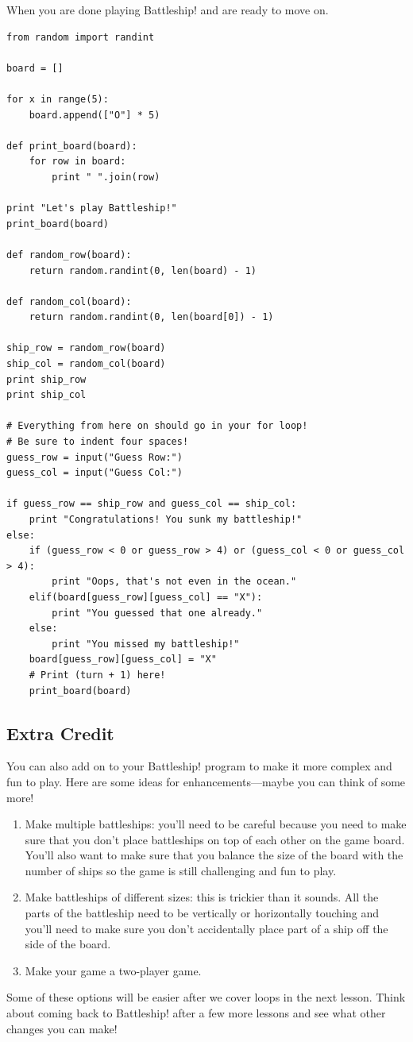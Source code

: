 \documentclass[12pt,a4paper,final,twoside,onecolumn,titlepage]{book}
\begin{document}
When you are done playing Battleship! and are ready to move on.
\begin{lstlisting}
from random import randint

board = []

for x in range(5):
    board.append(["O"] * 5)

def print_board(board):
    for row in board:
        print " ".join(row)

print "Let's play Battleship!"
print_board(board)

def random_row(board):
    return random.randint(0, len(board) - 1)

def random_col(board):
    return random.randint(0, len(board[0]) - 1)

ship_row = random_row(board)
ship_col = random_col(board)
print ship_row
print ship_col

# Everything from here on should go in your for loop!
# Be sure to indent four spaces!
guess_row = input("Guess Row:")
guess_col = input("Guess Col:")

if guess_row == ship_row and guess_col == ship_col:
    print "Congratulations! You sunk my battleship!"
else:
    if (guess_row < 0 or guess_row > 4) or (guess_col < 0 or guess_col > 4):
        print "Oops, that's not even in the ocean."
    elif(board[guess_row][guess_col] == "X"):
        print "You guessed that one already."
    else:
        print "You missed my battleship!"
    board[guess_row][guess_col] = "X"
    # Print (turn + 1) here!
    print_board(board)
\end{lstlisting}

\subsection{Extra Credit}

You can also add on to your Battleship! program to make it more complex and fun to play. Here are some ideas for enhancements—maybe you can think of some more!
\begin{enumerate}
\item    Make multiple battleships: you'll need to be careful because you need to make sure that you don’t place battleships on top of each other on the game board. You'll also want to make sure that you balance the size of the board with the number of ships so the game is still challenging and fun to play.

\item    Make battleships of different sizes: this is trickier than it sounds. All the parts of the battleship need to be vertically or horizontally touching and you’ll need to make sure you don’t accidentally place part of a ship off the side of the board.

\item    Make your game a two-player game.
\end{enumerate}
Some of these options will be easier after we cover loops in the next lesson. Think about coming back to Battleship! after a few more lessons and see what other changes you can make!
\end{document}
